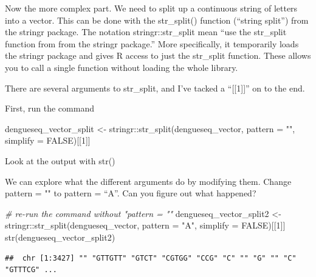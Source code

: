 \documentclass[
]{book}
\newenvironment{Shaded}{\begin{snugshade}}{\end{snugshade}}
\newcommand{\AttributeTok}[1]{\textcolor[rgb]{0.77,0.63,0.00}{#1}}
\newcommand{\CommentTok}[1]{\textcolor[rgb]{0.56,0.35,0.01}{\textit{#1}}}
\newcommand{\ConstantTok}[1]{\textcolor[rgb]{0.00,0.00,0.00}{#1}}
\newcommand{\DecValTok}[1]{\textcolor[rgb]{0.00,0.00,0.81}{#1}}
\newcommand{\FunctionTok}[1]{\textcolor[rgb]{0.00,0.00,0.00}{#1}}
\newcommand{\NormalTok}[1]{#1}
\newcommand{\OtherTok}[1]{\textcolor[rgb]{0.56,0.35,0.01}{#1}}
\newcommand{\SpecialCharTok}[1]{\textcolor[rgb]{0.00,0.00,0.00}{#1}}
\newcommand{\StringTok}[1]{\textcolor[rgb]{0.31,0.60,0.02}{#1}}
\begin{document}
Now the more complex part. We need to split up a continuous string of letters into a vector. This can be done with the str\_split() function (``string split'') from the stringr package. The notation stringr::str\_split mean ``use the str\_split function from from the stringr package.'' More specifically, it temporarily loads the stringr package and gives R access to just the str\_split function. These allows you to call a single function without loading the whole library.

There are several arguments to str\_split, and I've tacked a ``{[}{[}1{]}{]}'' on to the end.

First, run the command

\begin{Shaded}
\begin{Highlighting}[]
\NormalTok{dengueseq\_vector\_split }\OtherTok{\textless{}{-}}\NormalTok{ stringr}\SpecialCharTok{::}\FunctionTok{str\_split}\NormalTok{(dengueseq\_vector,}
                                       \AttributeTok{pattern =} \StringTok{""}\NormalTok{,}
                                       \AttributeTok{simplify =} \ConstantTok{FALSE}\NormalTok{)[[}\DecValTok{1}\NormalTok{]]}
\end{Highlighting}
\end{Shaded}

Look at the output with str()

We can explore what the different arguments do by modifying them. Change pattern = "" to pattern = ``A''. Can you figure out what happened?

\begin{Shaded}
\begin{Highlighting}[]
\CommentTok{\# re{-}run the command without "pattern  = ""}
\NormalTok{dengueseq\_vector\_split2 }\OtherTok{\textless{}{-}}\NormalTok{ stringr}\SpecialCharTok{::}\FunctionTok{str\_split}\NormalTok{(dengueseq\_vector,}
                                       \AttributeTok{pattern =} \StringTok{"A"}\NormalTok{,}
                                       \AttributeTok{simplify =} \ConstantTok{FALSE}\NormalTok{)[[}\DecValTok{1}\NormalTok{]]}
\FunctionTok{str}\NormalTok{(dengueseq\_vector\_split2)}
\end{Highlighting}
\end{Shaded}

\begin{verbatim}
##  chr [1:3427] "" "GTTGTT" "GTCT" "CGTGG" "CCG" "C" "" "G" "" "C" "GTTTCG" ...
\end{verbatim}
\end{document}
